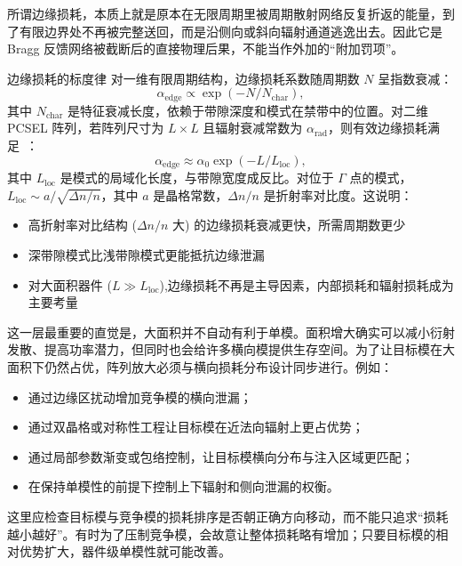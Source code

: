 所谓边缘损耗，本质上就是原本在无限周期里被周期散射网络反复折返的能量，到了有限边界处不再被完整送回，而是沿侧向或斜向辐射通道逃逸出去。因此它是 Bragg 反馈网络被截断后的直接物理后果，不能当作外加的“附加罚项”。
\begin{NoteBox}{边缘损耗的标度律}
对一维有限周期结构，边缘损耗系数随周期数 $N$ 呈指数衰减：
\begin{equation}
\alpha_{\mathrm{edge}} \propto \exp(-N/N_{\mathrm{char}}),
\end{equation}
其中 $N_{\mathrm{char}}$ 是特征衰减长度，依赖于带隙深度和模式在禁带中的位置。对二维 PCSEL 阵列，若阵列尺寸为 $L\times L$ 且辐射衰减常数为 $\alpha_{\mathrm{rad}}$，则有效边缘损耗满足~\cite{itoh2020,kogelnik1979distributed}：
\begin{equation}
\alpha_{\mathrm{edge}} \approx \alpha_0 \exp(-L/L_{\mathrm{loc}}),
\label{eq:edge_loss_scaling}
\end{equation}
其中 $L_{\mathrm{loc}}$ 是模式的局域化长度，与带隙宽度成反比。对位于 $\Gamma$ 点的模式，$L_{\mathrm{loc}} \sim a/\sqrt{\Delta n/n}$，其中 $a$ 是晶格常数，$\Delta n/n$ 是折射率对比度。这说明：
\begin{itemize}
  \item 高折射率对比结构 ($\Delta n/n$ 大) 的边缘损耗衰减更快，所需周期数更少
  \item 深带隙模式比浅带隙模式更能抵抗边缘泄漏
  \item 对大面积器件 ($L \gg L_{\mathrm{loc}}$),边缘损耗不再是主导因素，内部损耗和辐射损耗成为主要考量
\end{itemize}
\end{NoteBox}
这一层最重要的直觉是，大面积并不自动有利于单模。面积增大确实可以减小衍射发散、提高功率潜力，但同时也会给许多横向模提供生存空间。为了让目标模在大面积下仍然占优，阵列放大必须与横向损耗分布设计同步进行。例如：
\begin{itemize}
  \item 通过边缘区扰动增加竞争模的横向泄漏；
  \item 通过双晶格或对称性工程让目标模在近法向辐射上更占优势；
  \item 通过局部参数渐变或包络控制，让目标模横向分布与注入区域更匹配；
  \item 在保持单模性的前提下控制上下辐射和侧向泄漏的权衡。
\end{itemize}

这里应检查目标模与竞争模的损耗排序是否朝正确方向移动，而不能只追求“损耗越小越好”。有时为了压制竞争模，会故意让整体损耗略有增加；只要目标模的相对优势扩大，器件级单模性就可能改善。

